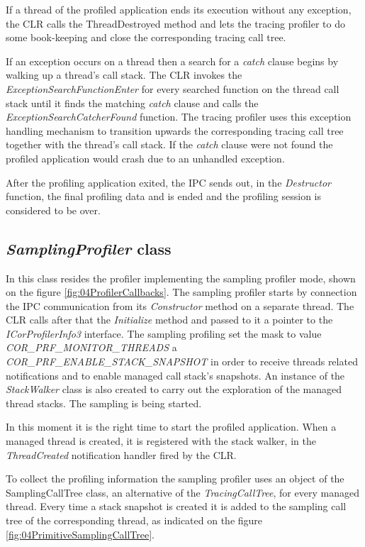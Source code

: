 If a thread of the profiled application ends its execution without any exception, the CLR calls the ThreadDestroyed method and lets the tracing profiler to do some book-keeping and close the corresponding tracing call tree.

If an exception occurs on a thread then a search for a \textit{catch} clause begins by walking up a thread's call stack. The CLR invokes the \textit{ExceptionSearchFunctionEnter} for every searched function on the thread call stack until it finds the matching \textit{catch} clause and calls the \textit{ExceptionSearchCatcherFound} function. The tracing profiler uses this exception handling mechanism to transition upwards the corresponding tracing call tree together with the thread's call stack. If the \textit{catch} clause were not found the profiled application would crash due to an unhandled exception.
 
After the profiling application exited, the IPC sends out, in the \textit{Destructor} function, the final profiling data and is ended and the profiling session is considered to be over.


\subsection{\textit{SamplingProfiler} class}
In this class resides the profiler implementing the sampling profiler mode, shown on the figure \ref{fig:04ProfilerCallbacks}. The sampling profiler starts by connection the IPC communication from its \textit{Constructor} method on a separate thread. The CLR calls after that the \textit{Initialize} method and passed to it a pointer to the \textit{ICorProfilerInfo3} interface. The sampling profiling set the mask to value \textit{COR\_PRF\_MONITOR\_THREADS} a \textit{COR\_PRF\_ENABLE\_STACK\_SNAPSHOT} in order to receive threads related notifications and to enable managed call stack's snapshots. An instance of the \textit{StackWalker} class is also created to carry out the exploration of the managed thread stacks. The sampling is being started.

In this moment it is the right time to start the profiled application. When a managed thread is created, it is registered with the stack walker, in the \textit{ThreadCreated} notification handler fired by the CLR.

To collect the profiling information the sampling profiler uses an object of the SamplingCallTree class, an alternative of the \textit{TracingCallTree}, for every managed thread. Every time a stack snapshot is created it is added to the sampling call tree of the corresponding thread, as indicated on the figure \ref{fig:04PrimitiveSamplingCallTree}. 

